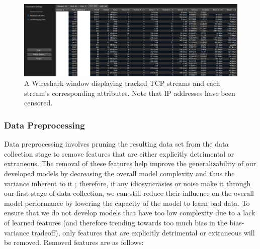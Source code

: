 \documentclass[10pt,sigconf,letterpaper,nonacm]{acmart}
\begin{document}
\begin{figure}[h]
  \centering
  \includegraphics[width=.8\pdfpagewidth]{img/wireshark.png}
  \caption{A Wireshark window displaying tracked TCP streams and each stream's corresponding attributes. Note that IP addresses have been censored.}
  \label{fig:wireshark}
\end{figure}

\subsubsection{Data Preprocessing}
Data preprocessing involves pruning the resulting data set from the data collection stage to remove features that are either explicitly detrimental or extraneous.
The removal of these features help improve the generalizability of our developed models by decreasing the overall model complexity and thus the variance inherent to it \cite{introInfo}; therefore, if any idiosyncrasies or noise make it through our first stage of data collection, we can still reduce their influence on the overall model performance by lowering the capacity of the model to learn bad data.
To ensure that we do not develop models that have too low complexity due to a lack of learned features (and therefore trending towards too much bias in the bias-variance tradeoff), only features that are explicitly detrimental or extraneous will be removed.
Removed features are as follows:
\end{document}
